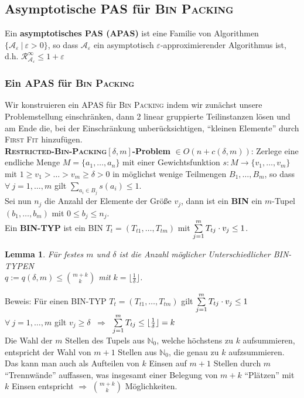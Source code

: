 \documentclass[a4paper,10pt]{scrartcl}
\newcommand{\tbf}{\textbf}
\newcommand{\tsc}{\textsc}
\newcommand{\Ra}{\Rightarrow}
\newcommand{\natn}{\mathbb{N}_0}
\newcommand{\calA}{\mathcal{A}}
\newcommand{\calR}{\mathcal{R}}
\newtheorem{lemma}{Lemma}
\begin{document}
\subsection{Asymptotische PAS für \tsc{Bin Packing}}
Ein \tbf{asymptotisches PAS (APAS)} ist eine Familie von Algorithmen $\{ \calA_\varepsilon \ | \ \varepsilon > 0 \}$, so dass $\calA_\varepsilon$ ein asymptotisch $\varepsilon$-approximierender Algorithmus ist, d.h. $\calR_{\calA_\varepsilon}^\infty \leq 1 + \varepsilon$ \\

\subsubsection{Ein APAS für \tsc{Bin Packing}}
Wir konstruieren ein APAS für \tsc{Bin Packing} indem wir zunächst unsere Problemstellung einschränken, dann 2 linear gruppierte Teilinstanzen lösen und am Ende die, bei der Einschränkung unberücksichtigen, ``kleinen Elemente'' durch \tsc{First Fit} hinzufügen. \\

\tbf{\tsc{Restricted-Bin-Packing}$[\delta,m]$-Problem} $\in O(n + c(\delta,m))$: Zerlege eine endliche Menge $M = \{a_1, \ldots, a_n\}$ mit einer Gewichtsfunktion $s: M \rightarrow \{v_1, \ldots, v_m\}$ mit $1 \geq v_1 > \ldots > v_m \geq \delta > 0$ in möglichst wenige Teilmengen $B_1, \ldots, B_m$, so dass $\forall \ j = 1, \ldots, m$ gilt  $\sum_{a_i \in B_j} \limits s(a_i) \leq 1$. \\

Sei nun $n_j$ die Anzahl der Elemente der Größe $v_j$, dann ist ein \tbf{BIN} ein $m$-Tupel $(b_1, \ldots, b_m)$ mit $0 \leq b_j \leq n_j$. \\

Ein \tbf{BIN-TYP} ist ein BIN $T_t = (T_{t1}, \ldots, T_{tm})$ mit $\sum_{j=1}^m \limits T_{tj} \cdot v_j \leq 1$. \\

\begin{lemma}
 Für festes $m$ und $\delta$ ist die Anzahl möglicher Unterschiedlicher BIN-TYPEN \\
$q := q(\delta,m) \leq \binom{m + k}{k}$ mit $k = \lfloor \frac{1}{\delta} \rfloor$.
\end{lemma}

Beweis: Für einen BIN-TYP $T_t = (T_{t1}, \ldots, T_{tm})$ gilt $\sum_{j=1}^m \limits T_{tj} \cdot v_j \leq 1$ \\
$\forall \ j = 1, \ldots, m$ gilt $v_j \geq \delta$ $\ \Ra \ $ $\sum_{j=1}^m \limits T_{tj} \leq \lfloor \frac{1}{\delta} \rfloor = k$ \\
Die Wahl der $m$ Stellen des Tupels aus $\natn$, welche höchstens zu $k$ aufsummieren, entspricht der Wahl von $m+1$ Stellen aus $\natn$, die genau zu $k$ aufzsummieren. Das kann man auch als Aufteilen von $k$ Einsen auf $m+1$ Stellen durch $m$ ``Trennwände'' auffassen, was insgesamt einer Belegung von $m + k$ ``Plätzen'' mit $k$ Einsen entspricht $\Ra$ $\binom{m + k}{k}$ Möglichkeiten. \\
\end{document}
